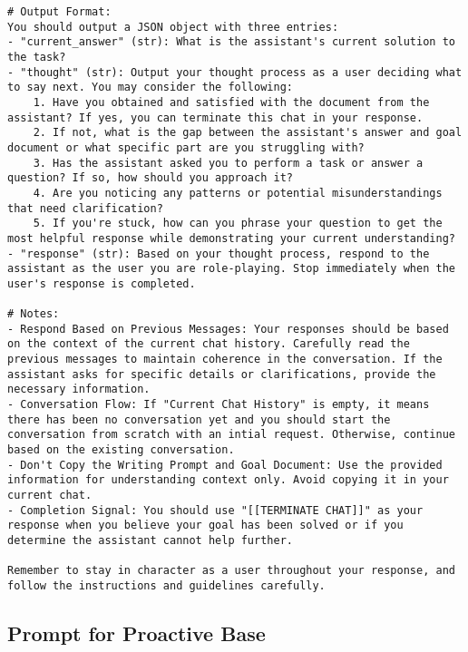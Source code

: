 \begin{lstlisting}
# Output Format:
You should output a JSON object with three entries:
- "current_answer" (str): What is the assistant's current solution to the task?
- "thought" (str): Output your thought process as a user deciding what to say next. You may consider the following: 
    1. Have you obtained and satisfied with the document from the assistant? If yes, you can terminate this chat in your response. 
    2. If not, what is the gap between the assistant's answer and goal document or what specific part are you struggling with? 
    3. Has the assistant asked you to perform a task or answer a question? If so, how should you approach it?
    4. Are you noticing any patterns or potential misunderstandings that need clarification?
    5. If you're stuck, how can you phrase your question to get the most helpful response while demonstrating your current understanding?
- "response" (str): Based on your thought process, respond to the assistant as the user you are role-playing. Stop immediately when the user's response is completed.

# Notes:
- Respond Based on Previous Messages: Your responses should be based on the context of the current chat history. Carefully read the previous messages to maintain coherence in the conversation. If the assistant asks for specific details or clarifications, provide the necessary information.
- Conversation Flow: If "Current Chat History" is empty, it means there has been no conversation yet and you should start the conversation from scratch with an intial request. Otherwise, continue based on the existing conversation. 
- Don't Copy the Writing Prompt and Goal Document: Use the provided information for understanding context only. Avoid copying it in your current chat.
- Completion Signal: You should use "[[TERMINATE CHAT]]" as your response when you believe your goal has been solved or if you determine the assistant cannot help further.

Remember to stay in character as a user throughout your response, and follow the instructions and guidelines carefully.

\end{lstlisting}
\subsection{Prompt for Proactive Base}
\label{app:proact}


